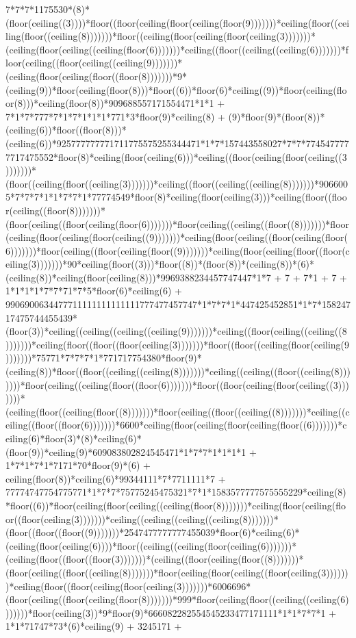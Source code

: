 7*7*7*1175530*(8)*(floor(ceiling((3))))*floor((floor(ceiling(floor(ceiling(floor(9)))))))*ceiling(floor((ceiling(floor((ceiling(8)))))))*floor((ceiling(floor(ceiling(floor(ceiling(3)))))))*(ceiling(floor(ceiling((ceiling(floor(6)))))))*ceiling((floor((ceiling((ceiling(6)))))))*floor(ceiling((floor(ceiling((ceiling(9)))))))*(ceiling(floor(ceiling(floor((floor(8)))))))*9*(ceiling(9))*floor(ceiling(floor(8)))*floor((6))*floor(6)*ceiling((9))*floor(ceiling(floor(8)))*ceiling(floor(8))*909688557171554471*1*1 + 7*1*7*777*7*1*7*1*1*1*771*3*floor(9)*ceiling(8) + (9)*floor(9)*(floor(8))*(ceiling(6))*floor((floor(8)))*(ceiling(6))*925777777771711775575255344471*1*7*157443558027*7*7*7745477777717475552*floor(8)*ceiling(floor(ceiling(6)))*ceiling((floor(ceiling(floor(ceiling((3)))))))*(floor((ceiling(floor((ceiling(3)))))))*ceiling((floor((ceiling((ceiling(8)))))))*9066005*7*7*7*1*1*7*7*1*77774549*floor(8)*ceiling(floor(ceiling(3)))*ceiling(floor((floor(ceiling((floor(8)))))))*(floor(ceiling((floor(ceiling(floor(6)))))))*floor(ceiling((ceiling((floor((8)))))))*floor(ceiling(floor(ceiling(floor(ceiling((9)))))))*ceiling(floor(ceiling((floor(ceiling(floor(6)))))))*floor(ceiling((floor(ceiling(floor((9)))))))*ceiling(floor(ceiling(floor((floor(ceiling(3)))))))*90*ceiling(floor((3)))*floor((8))*(floor(8))*(ceiling(8))*(6)*(ceiling(8))*ceiling(floor(ceiling(8)))*9969388234457747447*1*7 + 7 + 7*1 + 7 + 1*1*1*1*7*7*71*7*5*floor(6)*ceiling(6) + 9906900634477711111111111111777477457747*1*7*7*1*447425452851*1*7*15824717475744455439*(floor(3))*ceiling((ceiling((ceiling((ceiling(9)))))))*ceiling((floor(ceiling((ceiling((8)))))))*ceiling(floor((floor((floor(ceiling(3)))))))*floor((floor((ceiling(floor(ceiling(9)))))))*75771*7*7*7*1*771717754380*floor(9)*(ceiling(8))*floor((floor((ceiling((ceiling(8)))))))*ceiling((ceiling((floor((ceiling(8)))))))*floor(ceiling((ceiling(floor((floor(6)))))))*floor((floor(ceiling(floor(ceiling((3)))))))*(ceiling(floor((ceiling(floor((8)))))))*floor(ceiling((floor((ceiling((8)))))))*ceiling((ceiling((floor((floor(6)))))))*6600*ceiling(floor(ceiling(floor(ceiling(floor((6)))))))*ceiling(6)*floor(3)*(8)*ceiling(6)*(floor(9))*ceiling(9)*609083802824545471*1*7*7*1*1*1*1 + 1*7*1*7*1*7171*70*floor(9)*(6) + ceiling(floor(8))*ceiling(6)*99344111*7*7711111*7 + 77774747754775771*1*7*7*75775245475321*7*1*1583577777575555229*ceiling(8)*floor((6))*floor(ceiling(floor(ceiling((ceiling(floor(8)))))))*ceiling(floor(ceiling(floor((floor(ceiling(3)))))))*ceiling((ceiling((ceiling((ceiling(8)))))))*(floor((floor((floor((9)))))))*2547477777777455039*floor(6)*ceiling(6)*(ceiling(floor(ceiling(6))))*floor((ceiling((ceiling(floor(ceiling(6)))))))*(ceiling(floor((floor((floor(3)))))))*(ceiling((floor(ceiling(floor((8)))))))*(floor(ceiling((floor((ceiling(8)))))))*floor(ceiling(floor(ceiling((floor(ceiling(3)))))))*ceiling(floor((floor(ceiling(floor(ceiling(3)))))))*6006696*(floor(ceiling((floor(ceiling(floor(8)))))))*999*floor(ceiling(floor((ceiling((ceiling(6)))))))*floor(ceiling(3))*9*floor(9)*666082282554545233477171111*1*1*7*7*1 + 1*1*71747*73*(6)*ceiling(9) + 3245171 + 